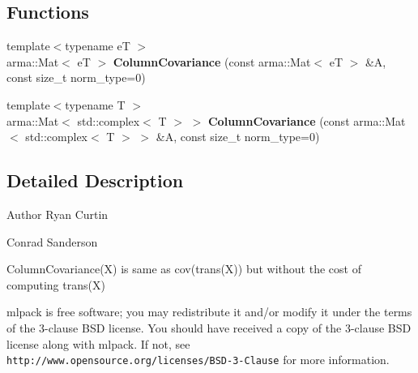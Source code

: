 \subsection*{Functions}
\begin{DoxyCompactItemize}
\item 
{\footnotesize template$<$typename eT $>$ }\\arma\+::\+Mat$<$ eT $>$ \textbf{ Column\+Covariance} (const arma\+::\+Mat$<$ eT $>$ \&A, const size\+\_\+t norm\+\_\+type=0)
\item 
{\footnotesize template$<$typename T $>$ }\\arma\+::\+Mat$<$ std\+::complex$<$ T $>$ $>$ \textbf{ Column\+Covariance} (const arma\+::\+Mat$<$ std\+::complex$<$ T $>$ $>$ \&A, const size\+\_\+t norm\+\_\+type=0)
\end{DoxyCompactItemize}


\subsection{Detailed Description}
\begin{DoxyAuthor}{Author}
Ryan Curtin 

Conrad Sanderson
\end{DoxyAuthor}
Column\+Covariance(\+X) is same as cov(trans(\+X)) but without the cost of computing trans(\+X)

mlpack is free software; you may redistribute it and/or modify it under the terms of the 3-\/clause B\+SD license. You should have received a copy of the 3-\/clause B\+SD license along with mlpack. If not, see {\tt http\+://www.\+opensource.\+org/licenses/\+B\+S\+D-\/3-\/\+Clause} for more information. 